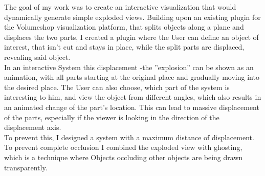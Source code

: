 The goal of my work was to create an interactive visualization that would dynamically generate simple exploded views. Building upon an existing plugin for the Volumeshop visualization platform, that splits objects along a plane and displaces the two parts,  I created a plugin where the User can define an object of interest, that isn't cut and stays in place, while the split parts are displaced, revealing said object.\\
In an interactive System this displacement -the ''explosion'' can be shown as an animation, with all parts starting at the original place and gradually moving into the desired place. The User can also choose, which part of the system is interesting to him, and view the object from different angles, which also results in an animated change of the part's location. This can lead to massive displacement of the parts, especially if the viewer is looking in the direction of the displacement axis.\\
To prevent this,  I designed a system with a maximum distance of displacement. To prevent complete  occlusion I combined the exploded view with ghosting, which is a technique where Objects occluding other objects are being drawn transparently. \\